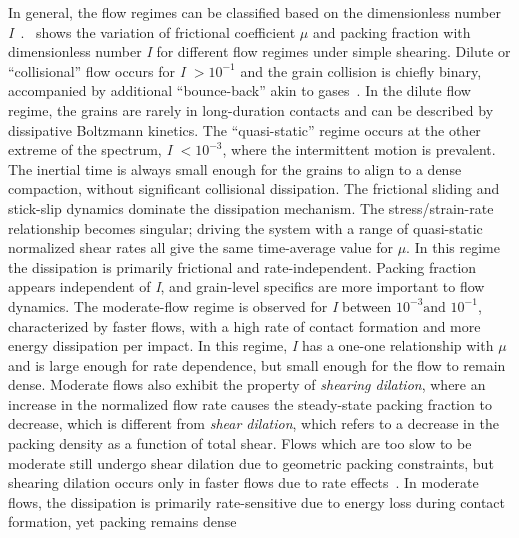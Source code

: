 In general, the flow regimes can be classified based on the dimensionless 
number \textit{I}~\citep{DaCruz2005}.~ shows the variation of 
frictional coefficient $\mu$ and packing fraction with dimensionless 
number \textit{I} for different flow regimes under simple shearing. Dilute or 
``collisional'' flow occurs for \textit{I} $>10^{-1}$ and the grain collision 
is chiefly binary, accompanied  by additional ``bounce-back'' akin to 
gases~\citep{Kamrin2008}. In the dilute flow regime, the grains are rarely in 
long-duration contacts and can be described by dissipative Boltzmann kinetics. 
The ``quasi-static'' regime occurs at the other extreme of the spectrum, 
\textit{I} $<10^{-3}$, where the intermittent motion is prevalent. The inertial 
time is always small enough for the grains to align to a dense compaction, 
without significant collisional dissipation. The frictional sliding and 
stick-slip dynamics dominate the dissipation mechanism. The stress/strain-rate 
relationship becomes singular; driving the system with a range of quasi-static 
normalized shear rates all give the same time-average value for $\mu$. In this 
regime the dissipation is primarily frictional and rate-independent. Packing 
fraction appears independent of \textit{I}, and grain-level specifics are more 
important to flow dynamics. The moderate-flow regime is observed for \textit{I} 
between $10^{-3} \mbox{and }10^{-1}$, characterized by faster flows, with a 
high rate of contact formation and more energy dissipation per impact. In this 
regime, \textit{I} has a one-one relationship with $\mu$ and is large enough 
for rate dependence, but small enough for the flow to remain dense. Moderate 
flows also exhibit the property of \textit{shearing dilation}, where an 
increase in the normalized flow rate causes the steady-state packing fraction 
to decrease, which is different from \textit{shear dilation}, which refers to a 
decrease in the packing density as a function of total shear. Flows which are 
too slow to be moderate still undergo shear dilation due to geometric packing 
constraints, but shearing dilation occurs only in faster flows due to rate 
effects~\citep{Kamrin2008}. In moderate flows, the dissipation is primarily 
rate-sensitive due to energy loss during contact formation, yet packing remains 
dense

